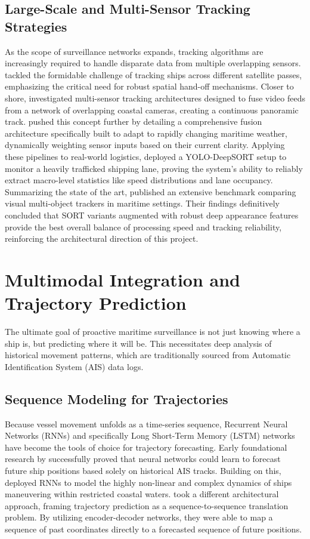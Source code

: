 \subsection{Large-Scale and Multi-Sensor Tracking Strategies}
As the scope of surveillance networks expands, tracking algorithms are increasingly required to handle disparate data from multiple overlapping sensors. \cite{Liu2024} tackled the formidable challenge of tracking ships across different satellite passes, emphasizing the critical need for robust spatial hand-off mechanisms. Closer to shore, \cite{Guan2023} investigated multi-sensor tracking architectures designed to fuse video feeds from a network of overlapping coastal cameras, creating a continuous panoramic track. \cite{Wan2025} pushed this concept further by detailing a comprehensive fusion architecture specifically built to adapt to rapidly changing maritime weather, dynamically weighting sensor inputs based on their current clarity. Applying these pipelines to real-world logistics, \cite{Wang2025a} deployed a YOLO-DeepSORT setup to monitor a heavily trafficked shipping lane, proving the system's ability to reliably extract macro-level statistics like speed distributions and lane occupancy. Summarizing the state of the art, \cite{Suliva2022} published an extensive benchmark comparing visual multi-object trackers in maritime settings. Their findings definitively concluded that SORT variants augmented with robust deep appearance features provide the best overall balance of processing speed and tracking reliability, reinforcing the architectural direction of this project.

\section{Multimodal Integration and Trajectory Prediction}
The ultimate goal of proactive maritime surveillance is not just knowing where a ship is, but predicting where it will be. This necessitates deep analysis of historical movement patterns, which are traditionally sourced from Automatic Identification System (AIS) data logs.

\subsection{Sequence Modeling for Trajectories}
Because vessel movement unfolds as a time-series sequence, Recurrent Neural Networks (RNNs) and specifically Long Short-Term Memory (LSTM) networks have become the tools of choice for trajectory forecasting. Early foundational research by \cite{Urakami2018} successfully proved that neural networks could learn to forecast future ship positions based solely on historical AIS tracks. Building on this, \cite{Capobianco2021} deployed RNNs to model the highly non-linear and complex dynamics of ships maneuvering within restricted coastal waters. \cite{Yang2022} took a different architectural approach, framing trajectory prediction as a sequence-to-sequence translation problem. By utilizing encoder-decoder networks, they were able to map a sequence of past coordinates directly to a forecasted sequence of future positions.

